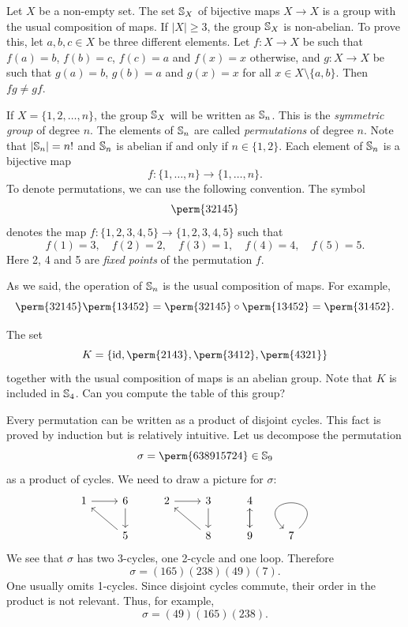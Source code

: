 \begin{example}
    Let $X$ be a non-empty set. The set $\mathbb{S}_X$ of bijective maps $X\to X$ 
    is a group with the usual composition of maps. If $|X|\geq3$, the group
    $\mathbb{S}_{X}$ is non-abelian. To prove this, let $a,b,c\in
        X$ be three different elements. Let $f\colon X\to X$ be such that
        $f(a)=b$, $f(b)=c$, $f(c)=
a$ and $f(x)=x$ otherwise, and $g\colon X\to
        X$ be such that $g(a)=b$, $g(b)=a$ and $g(x)=x$ for all $x\in
        X\setminus\{a,b\}$.  Then $fg\ne gf$.
\end{example}

\label{convention:right-to-left}
If $X=\{1,2,\dots,n\}$, the group $\mathbb{S}_X$ will be written as $\mathbb{S}_n$. This is
the \emph{symmetric group} of degree $n$. The elements of $\mathbb{S}_n$ are
called \emph{permutations} of degree $n$. 
Note that $|\mathbb{S}_n|=n!$ and $\mathbb{S}_n$
is abelian if and only if $n\in\{1,2\}$. Each element of $\mathbb{S}_n$ is a 
bijective map 
\[
f\colon\{1,\dots,n\}\to \{1,\dots,n\}.
\]
To denote permutations, 
we can use the following convention. The symbol  
\[
\perm{32145}
\]
denotes the map 
$f\colon\{1,2,3,4,5\}\to\{1,2,3,4,5\}$ such that 
\[
f(1)=3,
\quad f(2)=2,
\quad f(3)=1, 
\quad f(4)=4,
\quad f(5)=5.
\]
Here 2, 4 and 5 are \emph{fixed points} of the permutation $f$. 

As we said, the operation of $\mathbb{S}_n$ is the usual
composition of maps. 
For example, 
\[
\perm{32145}
\perm{13452}
=
\perm{32145}
\circ 
\perm{13452}
=\perm{31452}.
\]

\begin{example}
The set  
\[
K=\left\{ \id,\perm{2143},\perm{3412},\perm{4321}\right\}
\]
together with the usual composition of maps is an abelian group. 
Note that $K$ is included in $\mathbb{S}_{4}$.
Can you compute the table of this group?
\end{example}

Every permutation can be written as a product of disjoint cycles. This fact is
proved by induction but is relatively intuitive. Let us decompose the
permutation 
\[
\sigma=\perm{638915724}\in\Sym_{9}
\]
as a product of cycles. We need to 
draw a picture for $\sigma$:
\[\begin{tikzcd}
	1 & 6 & 2 & 3 & 4 & \\
	& 5 && 8 & 9 & 7\arrow[loop]        
	\arrow[from=1-1, to=1-2]
	\arrow[from=1-2, to=2-2]
	\arrow[from=2-2, to=1-1]
	\arrow[from=1-3, to=1-4]
	\arrow[from=1-4, to=2-4]
	\arrow[from=2-4, to=1-3]
	\arrow[from=1-5, to=2-5]
	\arrow[from=2-5, to=1-5]
\end{tikzcd}\]
We see that $\sigma$ has two 3-cycles, one 2-cycle
and one loop. 
Therefore 
\[
\sigma=(165)(238)(49)(7).
\]
One usually omits 1-cycles. Since disjoint cycles commute, their order in the
product is not relevant. Thus, for example,  
\[
\sigma=(49)(165)(238).
\]

